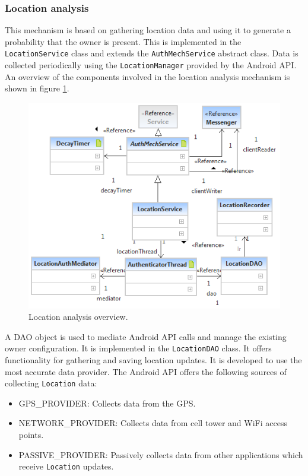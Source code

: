 \subsubsection{Location analysis}
This mechanism is based on gathering location data and using it to generate a probability that the owner is present. This is implemented in the {\tt LocationService} class and extends the {\tt AuthMechService} abstract class. Data is collected periodically using the {\tt LocationManager} provided by the Android API. An overview of the components involved in the location analysis mechanism is shown in figure \ref{fig:location}.
\begin{figure}[h]
    \centering
    \includegraphics[width=\textwidth]{Pictures/location-brief}
    \caption{Location analysis overview.}
    \label{fig:location}
\end{figure}

A DAO object is used to mediate Android API calls and manage the existing owner configuration. It is implemented in the {\tt LocationDAO} class. It offers functionality for gathering and saving location updates. It is developed to use the most accurate data provider. The Android API offers the following sources of collecting {\tt Location} data:
\begin{itemize}
	\item GPS\_PROVIDER: Collects data from the GPS.
	\item NETWORK\_PROVIDER: Collects data from cell tower and WiFi access points.
	\item PASSIVE\_PROVIDER: Passively collects data from other applications which receive {\tt Location} updates.
\end{itemize}

